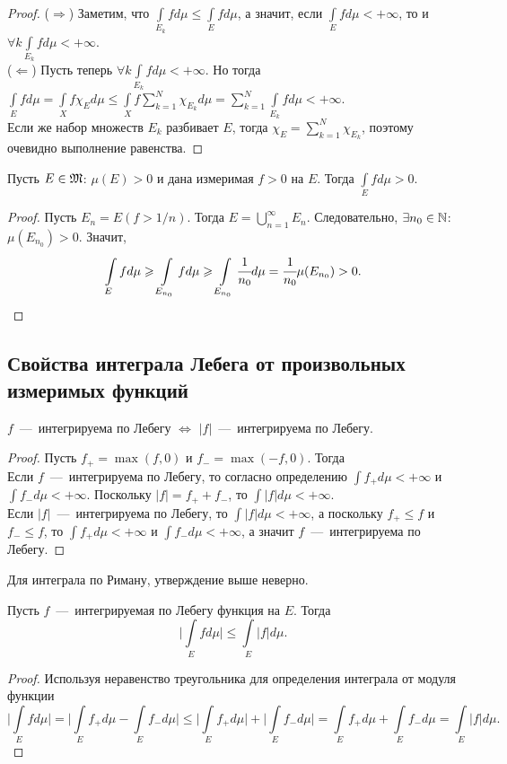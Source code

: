 \begin{proof}
    ($\Longrightarrow$) Заметим, что $\int\limits_{E_k} fd\mu \leq \int\limits_{E}fd\mu$, а значит, если $\int\limits_E fd\mu < +\infty$, то и $\forall k \int\limits_{E_k} fd\mu < +\infty$. \\
    ($\Longleftarrow$) Пусть теперь $\forall k \int\limits_{E_k} fd\mu < +\infty$. Но тогда $\int\limits_{E} fd\mu = \int\limits_X f\chi_{E}d\mu \leq \int\limits_X f\sum\limits_{k = 1}^N \chi_{E_k}d\mu = \sum\limits_{k = 1}^N \int\limits_{E_k} fd\mu < +\infty$. \\
    Если же набор множеств $E_k$ разбивает $E$, тогда $\chi_E = \sum\limits_{k = 1}^N \chi_{E_k}$, поэтому очевидно выполнение равенства.
\end{proof}
\begin{proposition}
    Пусть $E \in \MM$: $\mu(E) > 0$ и дана измеримая $f > 0$ на $E$. Тогда $\int\limits_{E} fd\mu > 0$.
\end{proposition}
\begin{proof}
    Пусть $E_n = E(f > 1/n)$. Тогда $E = \bigcup\limits_{n = 1}^\infty E_n$. Следовательно, $\exists n_0 \in \N$: $\mu(E_{n_0}) > 0$. Значит, \[\int\limits_{E} fd\mu \geq \int\limits_{E_{n_0}} fd\mu \geq \int\limits_{E_{n_0}} \cfrac{1}{n_0}d\mu = \cfrac{1}{n_0} \mu(E_{n_0}) > 0.\]
\end{proof}

\subsection{Свойства интеграла Лебега от произвольных измеримых функций}
\begin{proposition}
    $f$~---~интегрируема по Лебегу $\Longleftrightarrow$ $|f|$~---~интегрируема по Лебегу.
\end{proposition}
\begin{proof}
    Пусть $f_+ = \max(f, 0)$ и $f_- = \max(-f, 0)$. Тогда \\
    Если $f$~---~интегрируема по Лебегу, то согласно определению $\int f_+ d\mu < +\infty$ и $\int f_-d\mu < +\infty$. Поскольку $|f| = f_+ + f_-$, то $\int |f|d\mu < +\infty$. \\
    Если $|f|$~---~интегрируема по Лебегу, то $\int |f|d\mu < +\infty$, а поскольку $f_+ \leq f$ и $f_- \leq f$, то $\int f_+ d\mu < +\infty$ и $\int f_- d\mu < +\infty$, а значит $f$~---~интегрируема по Лебегу.
\end{proof}
\begin{note}
    Для интеграла по Риману, утверждение выше неверно.
\end{note}
\begin{proposition}
    Пусть $f$~---~интегрируемая по Лебегу функция на $E$. Тогда $$\biggr|\int\limits_E fd\mu\biggr| \leq \int\limits_E |f|d\mu.$$
\end{proposition}
\begin{proof} Используя неравенство треугольника для определения интеграла от модуля функции
    \[\Bigg|\int\limits_E fd\mu\Bigg| = \Bigg|\int\limits_{E} f_+d\mu - \int\limits_E f_-d\mu\Bigg| \leq \Bigg|\int\limits_E f_+d\mu\Bigg| + \Bigg|\int\limits_E f_-d\mu\Bigg| = \int\limits_E f_+d\mu + \int\limits_E f_-d\mu = \int\limits_E |f|d\mu.\]
\end{proof}

